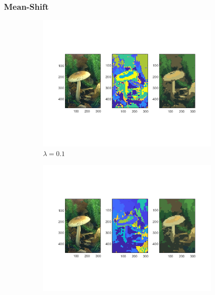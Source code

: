 \documentclass[12pt]{article}
\begin{document}
\subsubsection{Mean-Shift}

\begin{figure}[H]
	\centering
	\begin{subfigure}[b]{0.475\textwidth}
		\centering
		\includegraphics[width=\textwidth]{figs/2-c-ms-h6-s0-1}
		\caption[]%
		{{\small $\lambda = 0.1$}}    
		\label{fig:mean and std of net14}
	\end{subfigure}
	\hfill
	\begin{subfigure}[b]{0.475\textwidth}  
		\centering 
		\includegraphics[width=\textwidth]{figs/2-c-ms-h6-s0-5}

\end{subfigure}
\end{figure}
\end{document}
